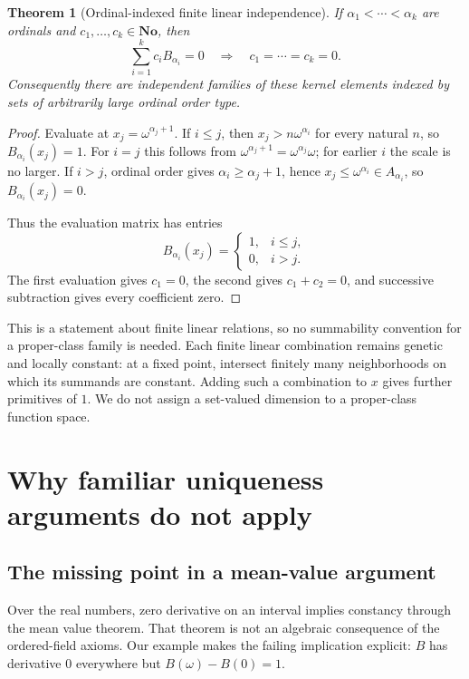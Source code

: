 \documentclass[11pt,letterpaper]{article}
\numberwithin{equation}{section}
\newtheorem{theorem}{Theorem}[section]
\theoremstyle{definition}
\theoremstyle{remark}
\newcommand{\No}{\mathbf{No}}
\begin{document}
\begin{theorem}[Ordinal-indexed finite linear independence]\label{thm:independent}
If $\alpha_1<\cdots<\alpha_k$ are ordinals and $c_1,\ldots,c_k\in\No$,
then
\[
 \sum_{i=1}^{k}c_iB_{\alpha_i}=0
 \quad\Longrightarrow\quad c_1=\cdots=c_k=0.
\]
Consequently there are independent families of these kernel elements
indexed by sets of arbitrarily large ordinal order type.
\end{theorem}
\begin{proof}
Evaluate at $x_j=\omega^{\alpha_j+1}$. If $i\le j$, then
$x_j>n\omega^{\alpha_i}$ for every natural $n$, so
$B_{\alpha_i}(x_j)=1$. For $i=j$ this follows from
$\omega^{\alpha_j+1}=\omega^{\alpha_j}\omega$; for earlier $i$ the
scale is no larger. If $i>j$, ordinal order gives
$\alpha_i\ge\alpha_j+1$, hence $x_j\le\omega^{\alpha_i}\in A_{\alpha_i}$,
so $B_{\alpha_i}(x_j)=0$.

Thus the evaluation matrix has entries
\[
 B_{\alpha_i}(x_j)=\begin{cases}1,&i\le j,\\0,&i>j.\end{cases}
\]
The first evaluation gives $c_1=0$, the second gives $c_1+c_2=0$, and
successive subtraction gives every coefficient zero.
\end{proof}

This is a statement about finite linear relations, so no summability
convention for a proper-class family is needed. Each finite linear
combination remains genetic and locally constant: at a fixed point,
intersect finitely many neighborhoods on which its summands are constant.
Adding such a combination to $x$ gives further primitives of $1$.
We do not assign a set-valued dimension to a proper-class function space.

\section{Why familiar uniqueness arguments do not apply}\label{sec:obstruction}
\subsection{The missing point in a mean-value argument}
Over the real numbers, zero derivative on an interval implies constancy
through the mean value theorem. That theorem is not an algebraic
consequence of the ordered-field axioms. Our example makes the failing
implication explicit: $B$ has derivative $0$ everywhere but
$B(\omega)-B(0)=1$.
\end{document}
